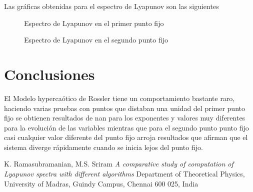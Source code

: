 \documentclass[10pt]{article}
\begin{document}
Las gr\'aficas obtenidas para el espectro de Lyapunov son las siguientes

\begin{figure}[H]
    \centering
    
    \caption{Espectro de Lyapunov en el primer punto fijo}
\end{figure}

\begin{figure}[H]
    \centering
    
    \caption{Espectro de Lyapunov en el segundo punto fijo}
\end{figure}

\section{Conclusiones}
El Modelo hyperca\'otico de Rossler tiene un comportamiento bastante raro, haciendo varias pruebas 
con puntos que distaban una unidad del primer punto fijo se obtienen resultados de nan para 
los 
exponentes y valores muy diferentes para la evoluci\'on de las variables mientras que para el 
segundo punto punto fijo casi cualquier valor diferente del punto fijo arroja resultados que 
afirman que el sistema diverge r\'apidamente cuando se inicia lejos del punto fijo. 

 
\begin{thebibliography}{9}
K. Ramasubramanian, M.S. Sriram
	\emph{A comparative study of computation of Lyapunov spectra with different algorithms}
Department of Theoretical Physics, University of Madras, Guindy Campus, Chennai 600 025, India
\end{thebibliography}
\end{document}
